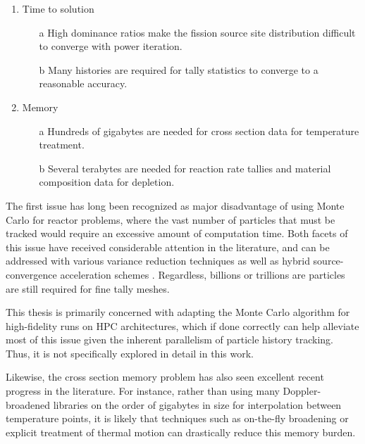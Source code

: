 \documentclass[12pt,twoside]{mitthesis-exec}
\begin{document}
\begin{enumerate}
  \item Time to solution
  \begin{itemize}
    \item[a] High dominance ratios make the fission source site distribution
        difficult to converge with power iteration.
    \item[b] Many histories are required for tally statistics to converge to a
        reasonable accuracy.
  \end{itemize}
  \item Memory
  \begin{itemize}
    \item[a] Hundreds of gigabytes are needed for cross section data for temperature treatment.
    \item[b] Several terabytes are needed for reaction rate tallies and material
        composition data for depletion.
  \end{itemize}
\end{enumerate}

The first issue has long been recognized as major disadvantage of using Monte
Carlo for reactor problems, where the vast number of particles that must be
tracked would require an excessive amount of computation time. Both facets of
this issue have received considerable attention in the literature, and can be
addressed with various variance reduction techniques as well as hybrid
source-convergence acceleration schemes \cite{mcnp, haghighat_monte_2003,
physor-kelly-2012, bherman_cmfd}. Regardless, billions or trillions are
particles are still required for fine tally meshes.

This thesis is primarily concerned with adapting the Monte Carlo algorithm
for high-fidelity runs on HPC architectures, which if done correctly can help
alleviate most of this issue given the inherent parallelism of particle history
tracking. Thus, it is not specifically explored in detail in this work.

Likewise, the cross section memory problem has also seen excellent recent
progress in the literature. For instance, rather than using many
Doppler-broadened libraries on the order of gigabytes in size for interpolation
between temperature points, it is likely that techniques such as on-the-fly
broadening \cite{nse-yesilyurt-2012, trans-brown-2012, forget_multipole,
multipole_physor2014} or explicit treatment of thermal motion
\cite{nse-viitanen-2012, physor-viitanen-2012} can drastically reduce this
memory burden.
\end{document}
